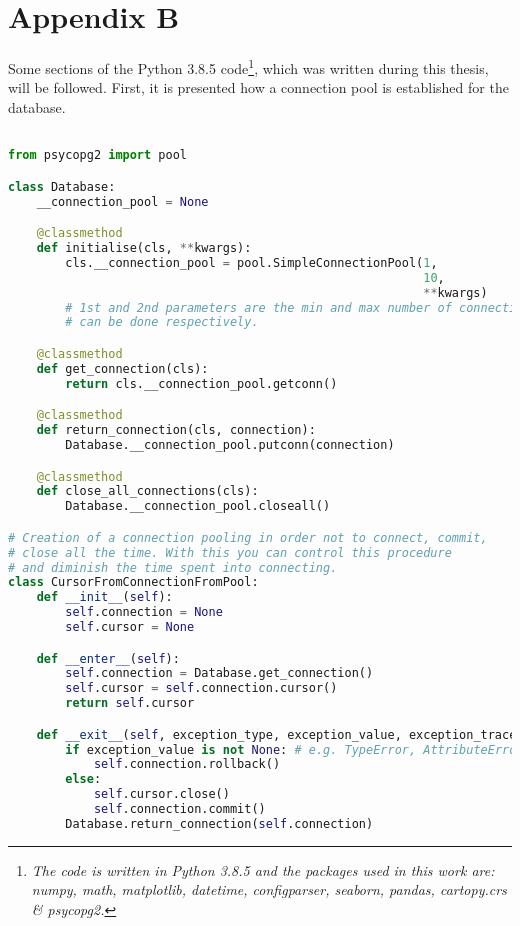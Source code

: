 \documentclass[12pt,a4paper,notitlepage,oneside,openright]{report}
\begin{document}
\newpage
\chapter*{Appendix B}
\label{appB}
Some sections of the Python 3.8.5 code\footnote{\label{Python_packages}\textit{The code is written in Python 3.8.5 and the packages used in this work are: numpy, math, matplotlib, datetime, configparser, seaborn, pandas, cartopy.crs \& psycopg2.}}, which was written during this thesis, will be followed. First, it is presented how a connection pool is established for the database.
\begin{center}
\begin{lstlisting}[language=Python, formfeed=\newpage, extendedchars=true] 

from psycopg2 import pool

class Database:
    __connection_pool = None

    @classmethod
    def initialise(cls, **kwargs):
        cls.__connection_pool = pool.SimpleConnectionPool(1,
                                                          10,
                                                          **kwargs)
        # 1st and 2nd parameters are the min and max number of connections that
        # can be done respectively.

    @classmethod
    def get_connection(cls):
        return cls.__connection_pool.getconn()

    @classmethod
    def return_connection(cls, connection):
        Database.__connection_pool.putconn(connection)

    @classmethod
    def close_all_connections(cls):
        Database.__connection_pool.closeall()

# Creation of a connection pooling in order not to connect, commit,
# close all the time. With this you can control this procedure
# and diminish the time spent into connecting.
class CursorFromConnectionFromPool:
    def __init__(self):
        self.connection = None
        self.cursor = None

    def __enter__(self):
        self.connection = Database.get_connection()
        self.cursor = self.connection.cursor()
        return self.cursor

    def __exit__(self, exception_type, exception_value, exception_traceback):
        if exception_value is not None: # e.g. TypeError, AttributeError, ValueError
            self.connection.rollback()
        else:
            self.cursor.close()
            self.connection.commit()
        Database.return_connection(self.connection)
\end{lstlisting}
\end{center}
\end{document}
